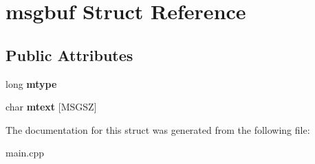 \hypertarget{structmsgbuf}{\section{msgbuf \-Struct \-Reference}
\label{structmsgbuf}
}
\subsection*{\-Public \-Attributes}
\begin{DoxyCompactItemize}
\item 
\hypertarget{structmsgbuf_a12a4780abaa96553f2ebf5fafeb58360}{long {\bfseries mtype}}\label{structmsgbuf_a12a4780abaa96553f2ebf5fafeb58360}

\item 
\hypertarget{structmsgbuf_ac989ab042e36af79aaf55a39368e98e5}{char {\bfseries mtext} \mbox{[}\-M\-S\-G\-S\-Z\mbox{]}}\label{structmsgbuf_ac989ab042e36af79aaf55a39368e98e5}

\end{DoxyCompactItemize}


\-The documentation for this struct was generated from the following file\-:\begin{DoxyCompactItemize}
\item 
main.\-cpp\end{DoxyCompactItemize}
